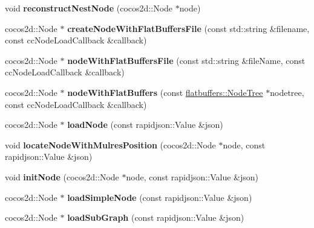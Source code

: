 \begin{DoxyCompactItemize}
\mbox{\label{classCSLoader_a391b7ba4f6c3995e9d34acc6af12fde6}} 
void {\bfseries reconstruct\+Nest\+Node} (cocos2d\+::\+Node $\ast$node)
\item 
\mbox{\label{classCSLoader_a456d1d4857a44fd3cc20e2352eedaa2c}} 
cocos2d\+::\+Node $\ast$ {\bfseries create\+Node\+With\+Flat\+Buffers\+File} (const std\+::string \&filename, const cc\+Node\+Load\+Callback \&callback)
\item 
\mbox{\label{classCSLoader_a9116b7d12cff57c45f1bf31ce74731a2}} 
cocos2d\+::\+Node $\ast$ {\bfseries node\+With\+Flat\+Buffers\+File} (const std\+::string \&file\+Name, const cc\+Node\+Load\+Callback \&callback)
\item 
\mbox{\label{classCSLoader_a0a2bc461754e11fc3d6654413a0e71c6}} 
cocos2d\+::\+Node $\ast$ {\bfseries node\+With\+Flat\+Buffers} (const \hyperlink{structflatbuffers_1_1NodeTree}{flatbuffers\+::\+Node\+Tree} $\ast$nodetree, const cc\+Node\+Load\+Callback \&callback)
\item 
\mbox{\label{classCSLoader_a2c5c56681d06249a0dfa1c76b4aa7232}} 
cocos2d\+::\+Node $\ast$ {\bfseries load\+Node} (const rapidjson\+::\+Value \&json)
\item 
\mbox{\label{classCSLoader_a2da41fc25515fa661dcc6fa1895cdf8d}} 
void {\bfseries locate\+Node\+With\+Mulres\+Position} (cocos2d\+::\+Node $\ast$node, const rapidjson\+::\+Value \&json)
\item 
\mbox{\label{classCSLoader_ae957f2baff1c6822b322fcef083418b5}} 
void {\bfseries init\+Node} (cocos2d\+::\+Node $\ast$node, const rapidjson\+::\+Value \&json)
\item 
\mbox{\label{classCSLoader_a09afd1ff11437bfb4c614baf6408912d}} 
cocos2d\+::\+Node $\ast$ {\bfseries load\+Simple\+Node} (const rapidjson\+::\+Value \&json)
\item 
\mbox{\label{classCSLoader_a280806823f4ab83f35ab183e7b435da3}} 
cocos2d\+::\+Node $\ast$ {\bfseries load\+Sub\+Graph} (const rapidjson\+::\+Value \&json)
\item 

\end{DoxyCompactItemize}

